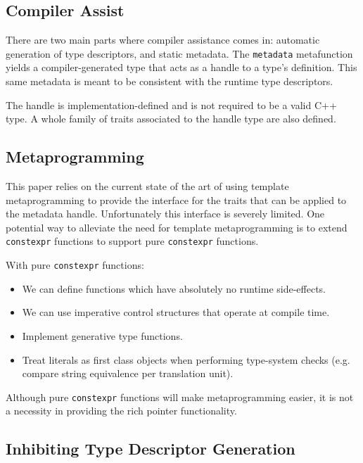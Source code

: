 \subsection{Compiler Assist}

There are two main parts where compiler assistance comes in: automatic
generation of type descriptors, and static metadata. The \verb+metadata+
metafunction yields a compiler-generated type that acts as a handle to a
type's definition. This same metadata is meant to be consistent with the
runtime type descriptors.

The handle is implementation-defined and is not required to be a valid C++
type. A whole family of traits associated to the handle type are also defined.

\subsection{Metaprogramming}

This paper relies on the current state of the art of using template
metaprogramming to provide the interface for the traits that can be applied to
the metadata handle. Unfortunately this interface is severely limited. One
potential way to alleviate the need for template metaprogramming is to extend
\verb+constexpr+ functions to support pure \verb+constexpr+ functions.

With pure \verb+constexpr+ functions:

\begin{itemize}

  \item We can define functions which have absolutely no runtime side-effects.

  \item We can use imperative control structures that operate at compile time.

  \item Implement generative type functions.

  \item Treat literals as first class objects when performing type-system
  checks (e.g. compare string equivalence per translation unit).

\end{itemize}

Although pure \verb+constexpr+ functions will make metaprogramming easier, it
is not a necessity in providing the rich pointer functionality.

\subsection{Inhibiting Type Descriptor Generation}

